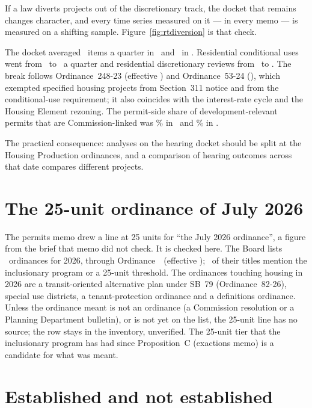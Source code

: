 \documentclass[11pt]{article}
\begin{document}
If a law diverts projects out of the discretionary track, the docket that remains changes
character, and every time series measured on it --- in every memo --- is measured on a shifting
sample. Figure~\ref{fig:rtdiversion} is that check.

The docket averaged \rtItemsPre\ items a quarter in \rtWinPre\ and \rtItemsPost\ in \rtWinPost.
Residential conditional uses went from \rtResCuPre\ to \rtResCuPost\ a quarter and residential
discretionary reviews from \rtResDrPre\ to \rtResDrPost. The break follows Ordinance~248-23
(effective \rtEffHpTwoZeroTwoThree) and Ordinance~53-24 (\rtEffHpTwoZeroTwoFour), which exempted
specified housing projects from Section~311 notice and from the conditional-use requirement; it
also coincides with the interest-rate cycle and the Housing Element rezoning. The permit-side share of
development-relevant permits that are Commission-linked was \rtLinkedEarly\% in \rtLinkWinEarly\ and
\rtLinkedLate\% in \rtLinkWinLate.

The practical consequence: analyses on the hearing docket should be split at the Housing
Production ordinances, and a comparison of hearing outcomes across that date compares different
projects.

\section{The 25-unit ordinance of July 2026}\label{sec:rtjuly}

The permits memo drew a line at 25 units for ``the July 2026 ordinance'', a figure from the brief
that memo did not check. It is checked here. The Board lists \rtSfTwentySix\ ordinances for
2026, through Ordinance~\rtSfLastOrd\ (effective \rtSfLastEff); \rtSfMatch\ of their titles
mention the inclusionary program or a 25-unit threshold. The ordinances touching housing in 2026
are a transit-oriented alternative plan under SB~79 (Ordinance~82-26), special use districts, a
tenant-protection ordinance and a definitions ordinance. Unless the ordinance meant is not an
ordinance (a Commission resolution or a Planning Department bulletin), or is not yet on the
list, the 25-unit line has no source; the row stays in the inventory, unverified. The 25-unit
tier that the inclusionary program has had since Proposition~C (exactions memo) is a candidate for what
was meant.

\section{Established and not established}\label{sec:rtest}
\end{document}
